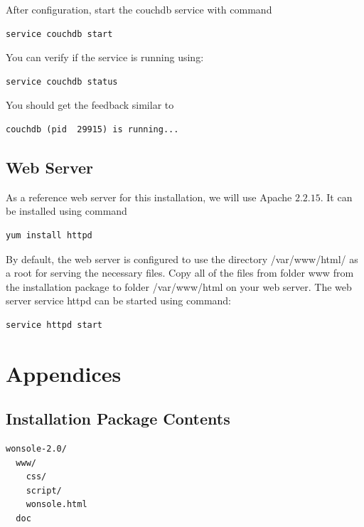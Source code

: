 After configuration, start the couchdb service with command
\begin{verbatim}
service couchdb start
\end{verbatim}
You can verify if the service is running using:
\begin{verbatim}
service couchdb status
\end{verbatim}
You should get the feedback similar to
\begin{verbatim}
couchdb (pid  29915) is running...
\end{verbatim}
\section{Web Server}
As a reference web server for this installation, we will use Apache $2.2.15$. It
can be installed using command
\begin{verbatim}
yum install httpd
\end{verbatim}
By default, the web server is configured to use the directory /var/www/html/ as
a root for serving the necessary files. Copy all of the files from folder www from
the installation package to folder /var/www/html on your web server.
The web server service httpd can be started using command:
\begin{verbatim}
service httpd start
\end{verbatim}



\chapter{Appendices}
\section{Installation Package Contents}
\begin{verbatim}
wonsole-2.0/
  www/
    css/
    script/
    wonsole.html
  doc
\end{verbatim}

